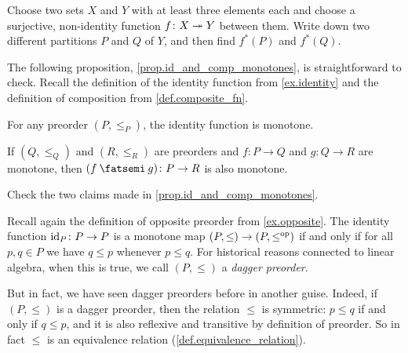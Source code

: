 \documentclass[7Sketches]{subfiles}
\begin{document}
\begin{exercise}%
\label{exc.f^*_partitions}
Choose two sets $X$ and $Y$ with at least three elements each and choose a
surjective, non-identity function $f\colon X\twoheadrightarrow Y$ between them. Write down two
different partitions $P$ and $Q$ of $Y$, and then find $f^*(P)$ and $f^*(Q)$.
\end{exercise}

The following proposition, \cref{prop.id_and_comp_monotones}, is straightforward to check. Recall the definition of the identity function from \cref{ex.identity} and the definition of composition from \cref{def.composite_fn}.%

\begin{proposition}%
\label{prop.id_and_comp_monotones}%
For any preorder $(P,\leq_P)$, the identity function is monotone.

If $(Q,\leq_Q)$ and $(R,\leq_R)$ are preorders and $f\colon P\to Q$ and $g\colon Q\to R$ are monotone, then $(f\cp g)\colon P\to R$ is also monotone.
\end{proposition}

\begin{exercise}%
\label{exc.check_id_comp_monotone}
Check the two claims made in \cref{prop.id_and_comp_monotones}.
\end{exercise}

\begin{example}%
\label{ex.dagger_preorder}%
%
Recall again the definition of opposite preorder from \cref{ex.opposite}. The
identity function $\mathrm{id}_P\colon P \to P$ is a monotone map $(P,\le) \to (P,
\leq^{\textnormal{op}})$ if and only if for all $p,q \in P$ we have $q \le p$ whenever $p\le
q$. For historical reasons connected to linear algebra, when this is true, we
call $(P,\le)$ a \emph{dagger preorder}. 

But in fact, we have seen dagger preorders before in another guise. Indeed, if $(P,\leq)$ is a dagger preorder, then the relation $\leq$ is symmetric: $p \le q$ if and only if
$q \le p$, and it is also reflexive and transitive by definition of preorder. So in fact $\leq$ is an equivalence relation (\cref{def.equivalence_relation}).
\end{example}%
\end{document}
